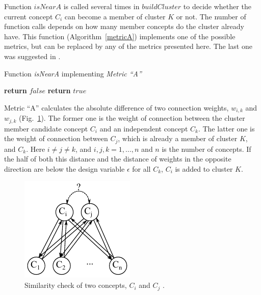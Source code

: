 \documentclass[graybox]{svmult}
\begin{document}
Function $isNearA$ is called several times in $buildCluster$ to decide whether the current concept $C_i$ can become a member of cluster $K$ or not. The number of function calls depends on how many member concepts do the cluster already have. This function (Algorithm~\ref{metricA}) implements one of the possible metrics, but can be replaced by any of the metrics presented here. The last one was suggested in \cite{hatwagnerm.f.koczyl.t.2015}.

\begin{algorithm}
  \caption{Function \emph{isNearA} implementing \emph{Metric ``A''}}\label{metricA}
  \begin{algorithmic}[1]
            \State \textbf{return} $false$
          \EndIf
        \EndIf
      \EndFor
      \State \textbf{return} $true$
    \EndFunction
  \end{algorithmic}
\end{algorithm}

Metric ``A'' calculates the absolute difference of two connection weights, $w_{i,k}$ and $w_{j,k}$ (Fig.~\ref{fig:similarity}). The former one is the weight of connection between the cluster member candidate concept $C_i$ and an independent concept $C_k$. The latter one is the weight of connection between $C_j$, which is already a member of cluster $K$, and $C_k$. Here $i \ne j \ne k$, and $i, j, k = 1, ..., n$ and $n$ is the number of concepts. If the half of both this distance and the distance of weights in the opposite direction are below the design variable $\epsilon$ for all $C_k$, $C_i$ is added to cluster $K$.

\begin{figure}[hbt]
  \sidecaption
  \includegraphics[scale=1]{similarity.pdf}
  \caption{Similarity check of two concepts, $C_i$ and $C_j$ \cite{hatwagner2018two}.}
  \label{fig:similarity}
\end{figure}
\end{document}
